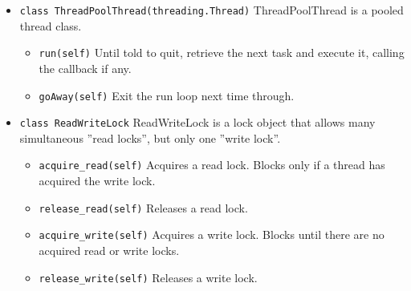 \documentclass{article}
\begin{document}
\begin{flushleft}
\begin{itemize}
  \item{ \verb$class ThreadPoolThread(threading.Thread)$ \linebreak
  ThreadPoolThread is a pooled thread class.
  }
  \begin{itemize}
    \item{ \verb$run(self)$ \linebreak
    Until told to quit, retrieve the next task and execute it, calling the callback if any.
    }
  \end{itemize}

  \begin{itemize}
    \item{ \verb$goAway(self)$ \linebreak
    Exit the run loop next time through.
    }
  \end{itemize}

\end{itemize}

\begin{itemize}
  \item{ \verb$class ReadWriteLock$ \linebreak
  ReadWriteLock is a lock object that allows many simultaneous ''read locks'', 
  but only one ''write lock''.
  }
  \begin{itemize}
    \item{ \verb$acquire_read(self)$ \linebreak
    Acquires a read lock. Blocks only if a thread has acquired the write lock.
    }
  \end{itemize}

  \begin{itemize}
    \item{ \verb$release_read(self)$ \linebreak
    Releases a read lock.
    }
  \end{itemize}

  \begin{itemize}
    \item{ \verb$acquire_write(self)$ \linebreak
    Acquires a write lock. Blocks until there are no acquired read or write locks.
    }
  \end{itemize}

  \begin{itemize}
    \item{ \verb$release_write(self)$ \linebreak
    Releases a write lock.
    }
  \end{itemize}


\end{itemize}
\end{flushleft}
\end{document}
